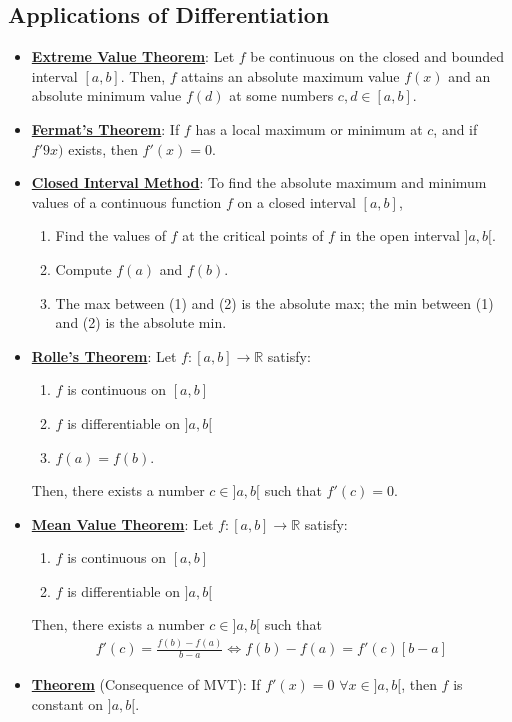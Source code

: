 \documentclass[11pt]{article}
\newcommand{\dfn}[1]{\underline{\textbf{#1}}}
\newcommand{\R}[0]{\mathbb{R}}
\begin{document}
\subsection{Applications of Differentiation}
\begin{itemize}[noitemsep]
	\item \dfn{Extreme Value Theorem}: Let $f$ be continuous on the closed and bounded interval $[a,b]$. Then, $f$ attains an absolute maximum value $f(x)$ and an absolute minimum value $f(d)$ at some numbers $c, d \in [a,b]$.
	\item \dfn{Fermat's Theorem}: If $f$ has a local maximum or minimum at $c$, and if $f'9x)$ exists, then $f'(x) =0$. 
	\item \dfn{Closed Interval Method}: To find the absolute maximum and minimum values of a continuous function $f$ on a closed interval $[a,b]$, 
	\begin{enumerate}[noitemsep]
		\item Find the values of $f$ at the critical points of $f$ in the open interval $]a,b[$. 
		\item Compute $f(a)$ and $f(b)$. 
		\item The max between (1) and (2) is the absolute max; the min between (1) and (2) is the absolute min. 
	\end{enumerate}
	\item \dfn{Rolle's Theorem}: Let $f: [a,b] \rightarrow \R$ satisfy: 
	\begin{enumerate}[noitemsep]
		\item $f$ is continuous on $[a,b]$
		\item $f$ is differentiable on $]a,b[$
		\item $f(a) = f(b)$. 
	\end{enumerate}
	Then, there exists a number $c \in ]a,b[$ such that $f'(c) = 0$. 
	\item \dfn{Mean Value Theorem}: Let $f: [a,b] \rightarrow \R$ satisfy: 
	\begin{enumerate}[noitemsep]
		\item $f$ is continuous on $[a,b]$ 
		\item $f$ is differentiable on $]a,b[$
	\end{enumerate}
	Then, there exists a number $c \in ]a,b[$ such that
	\begin{align}
		f'(c) = \frac{f(b) - f(a)}{b-a} \iff f(b) -f(a) = f'(c) [b-a]	
	\end{align}
	\item \dfn{Theorem} (Consequence of MVT): If $f'(x) =0$ $\forall x \in ]a,b[$, then $f$ is constant on $]a,b[$. 

\end{itemize}
\end{document}
